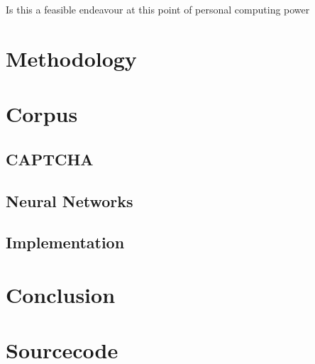 \documentclass[pdftex,a4paper,12pt,twoside]{report}
\begin{document}
Is this a feasible endeavour at this point of personal computing power

\chapter{Methodology}
\label{ch:methodology}




\chapter{Corpus}
\label{ch:corpus}


\section{CAPTCHA}
\label{sec:captcha}


\section{Neural Networks}
\label{sec:neuralnetworks}


\section{Implementation}
\label{sec:implementation}



\chapter{Conclusion}
\label{ch:conclusie}



\appendix

\chapter{Sourcecode}
\label{ch:Sourcecode}

%





\listoffigures
\listoftables

\lstlistoflistings
\end{document}
